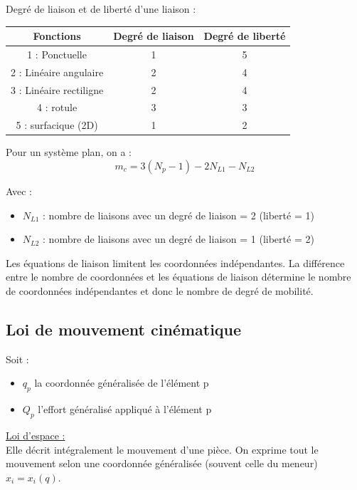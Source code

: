\documentclass[../main.tex]{subfiles}
\begin{document}
Degré de liaison et de liberté d'une liaison : \begin{table}[hbt!]
    \centering
    \begin{tabular}{|c|c|c|}
    \hline
        Fonctions & Degré de liaison & Degré de liberté \\
        \hline
         1 : Ponctuelle & 1 & 5\\
         2 : Linéaire angulaire & 2 & 4\\
         3 : Linéaire rectiligne & 2 & 4\\
         4 : rotule & 3 & 3\\
         5 : surfacique (2D) & 1 & 2\\
         \hline
    \end{tabular}
\end{table}

Pour un système plan, on a : \begin{equation}
    m_c = 3(N_p-1)-2N_{L1} -N_{L2}
\end{equation}

Avec : \begin{itemize}
    \item $N_{L1}$ : nombre de liaisons avec un degré de liaison = 2 (liberté = 1)\\
    \item $N_{L2}$ : nombre de liaisons avec un degré de liaison = 1 (liberté = 2)\\
\end{itemize}
Les équations de liaison limitent les coordonnées indépendantes. La différence entre le nombre de coordonnées et les équations de liaison détermine le nombre de coordonnées indépendantes et donc le nombre de degré de mobilité.\\

\subsection{Loi de mouvement cinématique}
Soit : \begin{itemize}
    \item $q_p$ la coordonnée généralisée de l'élément p\\
    \item $Q_p$ l'effort généralisé appliqué à l'élément p\\
\end{itemize}

\quad \underline{Loi d'espace :}\\
Elle décrit intégralement le mouvement d'une pièce. On exprime tout le mouvement selon une coordonnée généralisée (souvent celle du meneur) $x_i = x_i(q)$.\\
\end{document}
